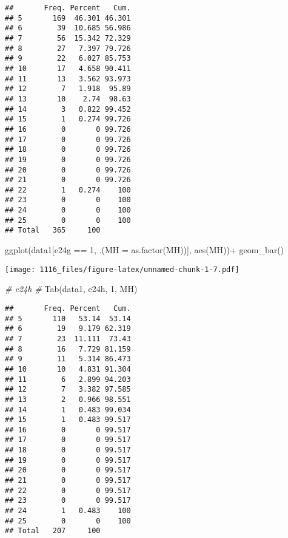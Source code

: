 \documentclass[
]{article}
\newenvironment{Shaded}{\begin{snugshade}}{\end{snugshade}}
\newcommand{\AttributeTok}[1]{\textcolor[rgb]{0.77,0.63,0.00}{#1}}
\newcommand{\CommentTok}[1]{\textcolor[rgb]{0.56,0.35,0.01}{\textit{#1}}}
\newcommand{\DecValTok}[1]{\textcolor[rgb]{0.00,0.00,0.81}{#1}}
\newcommand{\FunctionTok}[1]{\textcolor[rgb]{0.00,0.00,0.00}{#1}}
\newcommand{\NormalTok}[1]{#1}
\newcommand{\SpecialCharTok}[1]{\textcolor[rgb]{0.00,0.00,0.00}{#1}}
\newcommand{\StringTok}[1]{\textcolor[rgb]{0.31,0.60,0.02}{#1}}
\begin{document}
\begin{verbatim}
##       Freq. Percent   Cum.
## 5       169  46.301 46.301
## 6        39  10.685 56.986
## 7        56  15.342 72.329
## 8        27   7.397 79.726
## 9        22   6.027 85.753
## 10       17   4.658 90.411
## 11       13   3.562 93.973
## 12        7   1.918  95.89
## 13       10    2.74  98.63
## 14        3   0.822 99.452
## 15        1   0.274 99.726
## 16        0       0 99.726
## 17        0       0 99.726
## 18        0       0 99.726
## 19        0       0 99.726
## 20        0       0 99.726
## 21        0       0 99.726
## 22        1   0.274    100
## 23        0       0    100
## 24        0       0    100
## 25        0       0    100
## Total   365     100
\end{verbatim}

\begin{Shaded}
\begin{Highlighting}[]
\FunctionTok{ggplot}\NormalTok{(data1[e24g }\SpecialCharTok{==} \DecValTok{1}\NormalTok{, .(}\AttributeTok{MH =} \FunctionTok{as.factor}\NormalTok{(MH))], }\FunctionTok{aes}\NormalTok{(MH))}\SpecialCharTok{+}
    \FunctionTok{geom\_bar}\NormalTok{()}
\end{Highlighting}
\end{Shaded}

\texttt{[image: 1116\_files/figure-latex/unnamed-chunk-1-7.pdf]}

\begin{Shaded}
\begin{Highlighting}[]
\CommentTok{\# e24h \#}
\FunctionTok{Tab}\NormalTok{(data1, }\StringTok{\textquotesingle{}e24h\textquotesingle{}}\NormalTok{, }\DecValTok{1}\NormalTok{, }\StringTok{\textquotesingle{}MH\textquotesingle{}}\NormalTok{)}
\end{Highlighting}
\end{Shaded}

\begin{verbatim}
##       Freq. Percent   Cum.
## 5       110   53.14  53.14
## 6        19   9.179 62.319
## 7        23  11.111  73.43
## 8        16   7.729 81.159
## 9        11   5.314 86.473
## 10       10   4.831 91.304
## 11        6   2.899 94.203
## 12        7   3.382 97.585
## 13        2   0.966 98.551
## 14        1   0.483 99.034
## 15        1   0.483 99.517
## 16        0       0 99.517
## 17        0       0 99.517
## 18        0       0 99.517
## 19        0       0 99.517
## 20        0       0 99.517
## 21        0       0 99.517
## 22        0       0 99.517
## 23        0       0 99.517
## 24        1   0.483    100
## 25        0       0    100
## Total   207     100
\end{verbatim}
\end{document}
